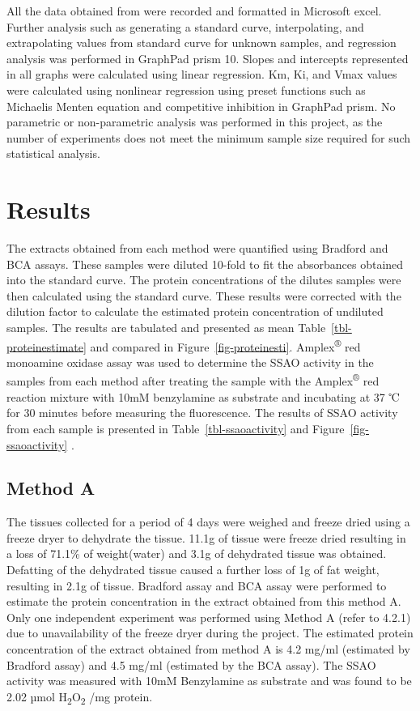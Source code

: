 \documentclass[
  letterpaper,
  DIV=11,
  numbers=noendperiod]{scrreprt}
\begin{document}
All the data obtained from were recorded and formatted in Microsoft
excel. Further analysis such as generating a standard curve,
interpolating, and extrapolating values from standard curve for unknown
samples, and regression analysis was performed in GraphPad prism 10.
Slopes and intercepts represented in all graphs were calculated using
linear regression. Km, Ki, and Vmax values were calculated using
nonlinear regression using preset functions such as Michaelis Menten
equation and competitive inhibition in GraphPad prism. No parametric or
non-parametric analysis was performed in this project, as the number of
experiments does not meet the minimum sample size required for such
statistical analysis.


\chapter{Results}\label{results}

The extracts obtained from each method were quantified using Bradford
and BCA assays. These samples were diluted 10-fold to fit the
absorbances obtained into the standard curve. The protein concentrations
of the dilutes samples were then calculated using the standard curve.
These results were corrected with the dilution factor to calculate the
estimated protein concentration of undiluted samples. The results are
tabulated and presented as mean Table~\ref{tbl-proteinestimate} and
compared in Figure~\ref{fig-proteinesti}. Amplex\textsuperscript{®} red
monoamine oxidase assay was used to determine the SSAO activity in the
samples from each method after treating the sample with the
Amplex\textsuperscript{®} red reaction mixture with 10mM benzylamine as
substrate and incubating at 37 ℃ for 30 minutes before measuring the
fluorescence. The results of SSAO activity from each sample is presented
in Table~\ref{tbl-ssaoactivity} and Figure~\ref{fig-ssaoactivity} .

\section{Method A}\label{method-a}

The tissues collected for a period of 4 days were weighed and freeze
dried using a freeze dryer to dehydrate the tissue. 11.1g of tissue were
freeze dried resulting in a loss of 71.1\% of weight(water) and 3.1g of
dehydrated tissue was obtained. Defatting of the dehydrated tissue
caused a further loss of 1g of fat weight, resulting in 2.1g of tissue.
Bradford assay and BCA assay were performed to estimate the protein
concentration in the extract obtained from this method A. Only one
independent experiment was performed using Method A (refer to 4.2.1) due
to unavailability of the freeze dryer during the project. The estimated
protein concentration of the extract obtained from method A is 4.2 mg/ml
(estimated by Bradford assay) and 4.5 mg/ml (estimated by the BCA
assay). The SSAO activity was measured with 10mM Benzylamine as
substrate and was found to be 2.02 µmol
H\textsubscript{2}O\textsubscript{2} /mg protein.
\end{document}

